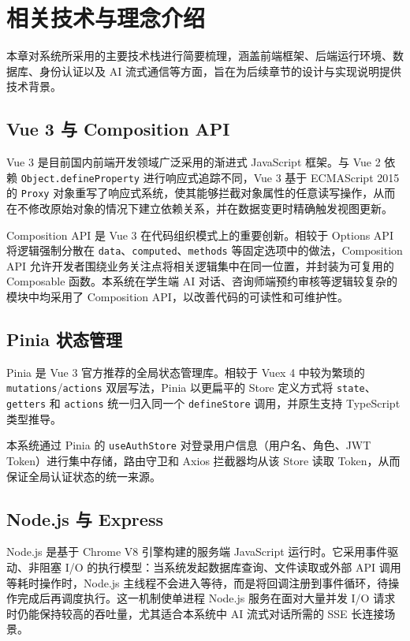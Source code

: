 \chapter{相关技术与理念介绍}

本章对系统所采用的主要技术栈进行简要梳理，涵盖前端框架、后端运行环境、数据库、身份认证以及 AI 流式通信等方面，旨在为后续章节的设计与实现说明提供技术背景。

\section{Vue 3 与 Composition API}

Vue 3 是目前国内前端开发领域广泛采用的渐进式 JavaScript 框架\cite{vuejs3docs}。与 Vue 2 依赖 \texttt{Object.defineProperty} 进行响应式追踪不同，Vue 3 基于 ECMAScript 2015 的 \texttt{Proxy} 对象重写了响应式系统，使其能够拦截对象属性的任意读写操作，从而在不修改原始对象的情况下建立依赖关系，并在数据变更时精确触发视图更新。

Composition API 是 Vue 3 在代码组织模式上的重要创新。相较于 Options API 将逻辑强制分散在 \texttt{data}、\texttt{computed}、\texttt{methods} 等固定选项中的做法，Composition API 允许开发者围绕业务关注点将相关逻辑集中在同一位置，并封装为可复用的 Composable 函数。本系统在学生端 AI 对话、咨询师端预约审核等逻辑较复杂的模块中均采用了 Composition API，以改善代码的可读性和可维护性。

\section{Pinia 状态管理}

Pinia 是 Vue 3 官方推荐的全局状态管理库\cite{piniadocs}。相较于 Vuex 4 中较为繁琐的 \texttt{mutations}/\texttt{actions} 双层写法，Pinia 以更扁平的 Store 定义方式将 \texttt{state}、\texttt{getters} 和 \texttt{actions} 统一归入同一个 \texttt{defineStore} 调用，并原生支持 TypeScript 类型推导。

本系统通过 Pinia 的 \texttt{useAuthStore} 对登录用户信息（用户名、角色、JWT Token）进行集中存储，路由守卫和 Axios 拦截器均从该 Store 读取 Token，从而保证全局认证状态的统一来源。

\section{Node.js 与 Express}

Node.js 是基于 Chrome V8 引擎构建的服务端 JavaScript 运行时\cite{cantelon2018}。它采用事件驱动、非阻塞 I/O 的执行模型：当系统发起数据库查询、文件读取或外部 API 调用等耗时操作时，Node.js 主线程不会进入等待，而是将回调注册到事件循环，待操作完成后再调度执行。这一机制使单进程 Node.js 服务在面对大量并发 I/O 请求时仍能保持较高的吞吐量，尤其适合本系统中 AI 流式对话所需的 SSE 长连接场景。

